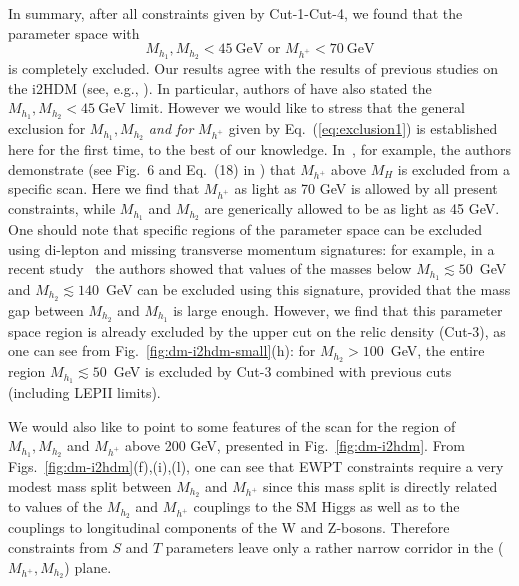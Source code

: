 \documentclass[12pt,a4paper]{article}
\begin{document}
In summary, after all constraints given by Cut-1-Cut-4,
we found that the parameter space with  
\begin{equation}
M_{h_1},M_{h_2}<45~\mbox{GeV} 
\mbox{\ or\ } M_{h^+}<70~\mbox{GeV} 
\label{eq:exclusion1}
\end{equation}
is completely excluded. Our results  agree with the results of previous studies on the i2HDM (see, e.g., \cite{Arhrib:2013ela,Ilnicka:2015jba}).
In particular, authors of \cite{Ilnicka:2015jba} have also stated 
the $M_{h_1},M_{h_2}<45~\mbox{GeV}$ limit.
However we would like to stress that the general exclusion 
for $M_{h_1},M_{h_2}$ {\it and for} $M_{h^+}$
given by Eq.~(\ref{eq:exclusion1}) is established here for the first time, to the best of our knowledge. In~\cite{Ilnicka:2015jba}, for example,  the authors demonstrate 
(see Fig.~6 and Eq.~(18) in \cite{Ilnicka:2015jba}) that 
$M_{h^+}$ above $M_H$ is excluded from a  specific scan. Here we find that
$M_{h^+}$ as light as 70 GeV  is allowed by all present constraints, while $M_{h_1}$ and
$M_{h_2}$ are generically allowed to be as light as 45 GeV. One should note that specific regions of the
parameter space can be excluded using di-lepton and missing transverse momentum
signatures: for example, in a recent study~\cite{Belanger:2015kga} the authors showed that values of the masses below
$M_{h_1}\lesssim 50$~GeV and  $M_{h_2}\lesssim 140$~GeV can be excluded using this signature,
provided that the mass gap between $M_{h_2}$ and $M_{h_1}$ is large enough. However, we find that this parameter
space region is already excluded by the upper cut on the relic density (Cut-3), as one can see
from Fig.~\ref{fig:dm-i2hdm-small}(h): for  $M_{h_2}>100$~GeV, the entire region $M_{h_1}\lesssim
50$~GeV  is excluded by Cut-3 combined with previous cuts (including LEPII limits).

We would also like to point to some features of the scan for  the region of $M_{h_1},M_{h_2}$ and
$M_{h^{+}}$ above 200 GeV, presented  in Fig.~\ref{fig:dm-i2hdm}. From 
Figs.~\ref{fig:dm-i2hdm}(f),(i),(l), one can see that EWPT constraints require a very  modest
mass split between $M_{h_2}$ and $M_{h^{+}}$ since this mass split is directly related to
values of the $M_{h_2}$ and $M_{h^{+}}$ couplings to  the SM Higgs as well as to the couplings
to longitudinal components of the W and Z-bosons. Therefore constraints from $S$ and $T$
parameters leave only a rather narrow corridor in the  ($M_{h^{+}},M_{h_2}$) plane.
\end{document}
